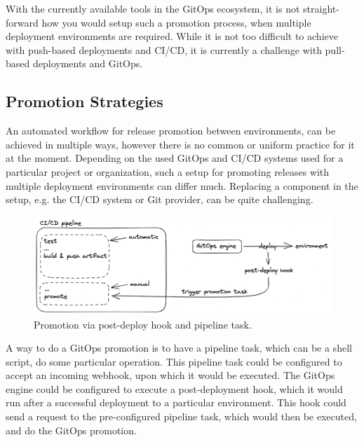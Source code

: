 With the currently available tools in the GitOps ecosystem,
it is not straight-forward how you would setup such a promotion process,
when multiple deployment environments are required.
While it is not too difficult to achieve with push-based deployments and CI/CD,
it is currently a challenge with pull-based deployments and GitOps.

\subsection*{Promotion Strategies}

An automated workflow for release promotion between environments,
can be achieved in multiple ways,
however there is no common or uniform practice for it at the moment.
Depending on the used GitOps and CI/CD systems used for a particular project or organization,
such a setup for promoting releases with multiple deployment environments can differ much.
Replacing a component in the setup, e.g. the CI/CD system or Git provider, can be quite challenging.

\begin{figure}[h]
	\centering
	\includegraphics[width=0.99\linewidth]{assets/promotion-by-pipeline-task-post-deploy-hook.png}
	\caption{Promotion via post-deploy hook and pipeline task.
	}
	\label{fig:promotion-by-pipeline-task-post-deploy-hook}	
\end{figure}

A way to do a GitOps promotion is to have a pipeline task, which can be a shell script,
do some particular operation. This pipeline task could be configured to accept an incoming webhook,
upon which it would be executed.
The GitOps engine could be configured to execute a post-deployment hook,
which it would run after a successful deployment to a particular environment.
This hook could send a request to the pre-configured pipeline task, which would then be executed,
and do the GitOps promotion.












